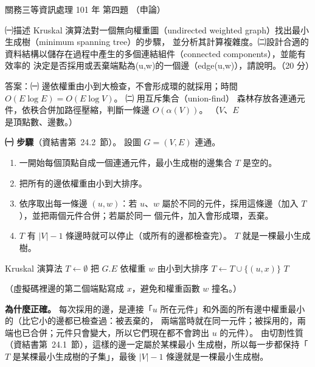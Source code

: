 \begin{pastexam}[label={px:gw3-101-ds-04}]{關務三等資訊處理 101 年 第四題}
（申論）

㈠描述 Kruskal 演算法對一個無向權重圖（undirected weighted graph）找出最小生成樹（minimum spanning tree）的步驟，
並分析其計算複雜度。㈡設計合適的資料結構以儲存在過程中產生的多個連結組件（connected components），並能有效率的
決定是否採用或丟棄端點為(u,w)的一個邊（edge(u,w)），請說明。（20 分）
\end{pastexam}

\begin{pastsoln}
答案：㈠ 邊依權重由小到大檢查，不會形成環的就採用；時間 $O(E \log E) = O(E \log V)$。 ㈡ 用互斥集合（union-find）
森林存放各連通元件，依秩合併加路徑壓縮，判斷一條邊 $O(\alpha(V))$。 （$V$、$E$ 是頂點數、邊數。）

\textbf{㈠ 步驟}（資結書第~24.2~節）。 設圖 $G = (V, E)$ 連通。
\begin{enumerate}
\item 一開始每個頂點自成一個連通元件，最小生成樹的邊集合 $T$ 是空的。
\item 把所有的邊依權重由小到大排序。
\item 依序取出每一條邊 $(u, w)$：若 $u$、$w$ 屬於不同的元件，採用這條邊（加入 $T$），並把兩個元件合併；若屬於同一
個元件，加入會形成環，丟棄。
\item $T$ 有 $|V| - 1$ 條邊時就可以停止（或所有的邊都檢查完）。 $T$ 就是一棵最小生成樹。
\end{enumerate}
\begin{pseudo}{Kruskal 演算法}
    \State $T \gets \emptyset$
        \State {}
    \EndFor
    \State 把 $G.E$ 依權重 $w$ 由小到大排序
         
            \State $T \gets T \cup \{(u, x)\}$
            \State {}
        \EndIf
    \EndFor
    \State \Return $T$
\EndFunction
\end{pseudo}
（虛擬碼裡邊的第二個端點寫成 $x$，避免和權重函數 $w$ 撞名。）

\textbf{為什麼正確。} 每次採用的邊，是連接「$u$ 所在元件」和外面的所有邊中權重最小的（比它小的邊都已檢查過：被丟棄的，
兩端當時就在同一元件；被採用的，兩端也已合併；元件只會變大，所以它們現在都不會跨出 $u$ 的元件）。 由切割性質（資結書第~24.1~節），這樣的邊一定屬於某棵最小
生成樹，所以每一步都保持「$T$ 是某棵最小生成樹的子集」，最後 $|V| - 1$ 條邊就是一棵最小生成樹。


\end{pastsoln}

